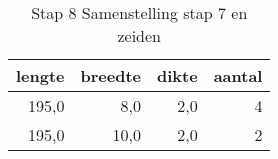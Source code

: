 \begin{table}[h!]
\centering
\caption{Stap 8 Samenstelling stap 7 en zeiden}
\begin{tabular}{rrrr}
\toprule
 lengte &  breedte &  dikte &  aantal \\
\midrule
  195,0 &      8,0 &    2,0 &       4 \\
  195,0 &     10,0 &    2,0 &       2 \\
\bottomrule
\end{tabular}
\end{table}

